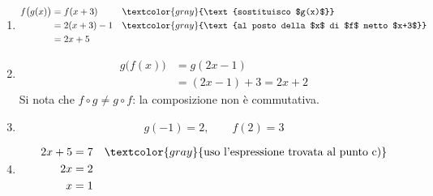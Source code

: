 \begin{question}[ID=1.1, subtitle={Composizione di funzioni}, difficulty=facile, tags={funzioni, composizione}]
\begin{explanation}
\begin{enumerate}
    \item \[\begin{aligned}
    f\big(g(x)\big) &= f(x+3) && \textcolor{gray}{\text{sostituisco $g(x)$}}\\
    &= 2(x+3)-1 && \textcolor{gray}{\text{al posto della $x$ di $f$ metto $x+3$}}\\
    &= 2x+5
    \end{aligned}\]
    \item \[\begin{aligned}
    g\big(f(x)\big) &= g(2x-1)\\
    &= (2x-1)+3=2x+2
    \end{aligned}\]
    Si nota che $f\circ g\neq g\circ f$: la composizione non è commutativa.
    \item \[ g(-1)=2, \qquad f(2)=3 \]
    \item \[\begin{aligned}
    2x+5 &= 7 && \textcolor{gray}{\text{uso l'espressione trovata al punto c)}}\\
    2x &= 2\\
    x &= 1
    \end{aligned}\]
\end{enumerate}
\end{explanation}
\end{question}


